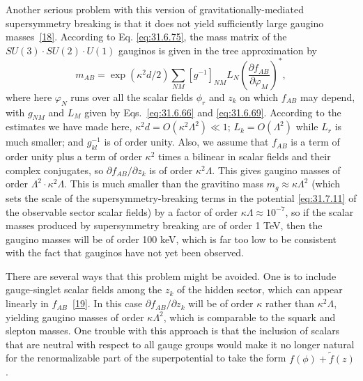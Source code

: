 Another serious problem with this version of gravitationally-mediated
supersymmetry breaking is that it does not yield sufficiently large gaugino
masses~\hyperref[ch31-ref-18]{[18]}. According to Eq.
\eqref{eq:31.6.75}, the mass matrix of the
\(SU(3)\cdot SU(2)\cdot U(1)\) gauginos is given in the tree approximation
by
\begin{equation}
  m_{AB}
  =\exp(\kappa^2d/2)\sum_{NM}[g^{-1}]_{NM}L_N
    \left(\frac{\partial f_{AB}}{\partial\varphi_M}\right)^*,
  \tag{31.7.13}\label{eq:31.7.13}
\end{equation}
where here \(\varphi_N\) runs over all the scalar fields \(\phi_r\) and
\(z_k\) on which \(f_{AB}\) may depend, with \(g_{NM}\) and \(L_M\) given by
Eqs.~\eqref{eq:31.6.66} and \eqref{eq:31.6.69}. According to the estimates
we have made here, \(\kappa^2d=O(\kappa^2\Lambda^2)\ll1\);
\(L_k=O(\Lambda^2)\) while \(L_r\) is much smaller; and \(g_{kl}^{-1}\) is
of order unity. Also, we assume that
\(f_{AB}\) is a term of order unity plus a term of order \(\kappa^2\) times
a bilinear in scalar fields and their complex conjugates, so
\(\partial f_{AB}/\partial z_k\) is of order \(\kappa^2\Lambda\). This gives
gaugino masses of order \(\Lambda^2\cdot\kappa^2\Lambda\). This is much
smaller than the gravitino mass \(m_g\approx\kappa\Lambda^2\) (which sets
the scale of the supersymmetry-breaking terms in the potential
\eqref{eq:31.7.11} of the observable sector scalar fields) by a factor of
order \(\kappa\Lambda\approx10^{-7}\), so if the scalar masses produced by
supersymmetry breaking are of order 1 TeV, then the gaugino masses will be
of order 100 keV, which is far too low to be consistent with the fact that
gauginos have not yet been observed.

There are several ways that this problem might be avoided. One is to include
gauge-singlet scalar fields among the \(z_k\) of the hidden sector, which can
appear linearly in \(f_{AB}\)~\hyperref[ch31-ref-19]{[19]}. In this case
\(\partial f_{AB}/\partial z_k\) will be of order \(\kappa\) rather than
\(\kappa^2\Lambda\), yielding gaugino masses of order
\(\kappa\Lambda^2\), which is comparable to the squark and slepton masses.
One trouble with this approach is that the inclusion of scalars that are
neutral with respect to all gauge groups would make it no longer natural for
the renormalizable part of the superpotential to take the form
\(f(\phi)+\widetilde f(z)\).

